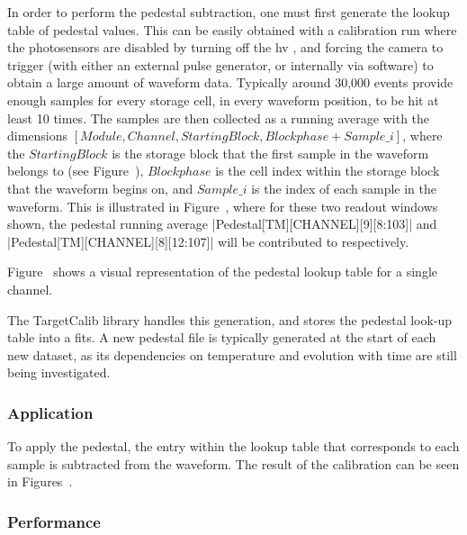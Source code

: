In order to perform the pedestal subtraction, one must first generate the lookup table of pedestal values. This can be easily obtained with a calibration run where the photosensors are disabled by turning off the \gls{hv} , and forcing the camera to trigger (with either an external pulse generator, or internally via software) to obtain a large amount of waveform data. Typically around 30,000 events provide enough samples for every storage cell, in every waveform position, to be hit at least 10 times. The samples are then collected as a running average with the dimensions $[Module, Channel, Starting Block, Blockphase+Sample\_i]$, where the $Starting Block$ is the storage block that the first sample in the waveform belongs to (see Figure~), $Blockphase$ is the cell index within the storage block that the waveform begins on, and $Sample\_i$ is the index of each sample in the waveform. This is illustrated in Figure~, where for these two readout windows shown, the pedestal running average |Pedestal[TM][CHANNEL][9][8:103]| and |Pedestal[TM][CHANNEL][8][12:107]| will be contributed to respectively.

Figure~ shows a visual representation of the pedestal lookup table for a single channel. 

The TargetCalib library handles this generation, and stores the pedestal look-up table into a \gls{fits}. A new pedestal file is typically generated at the start of each new dataset, as its dependencies on temperature and evolution with time are still being investigated.

\subsubsection{Application}

To apply the pedestal, the entry within the lookup table that corresponds to each sample is subtracted from the waveform. The result of the calibration can be seen in Figures~. 

\subsubsection{Performance}


